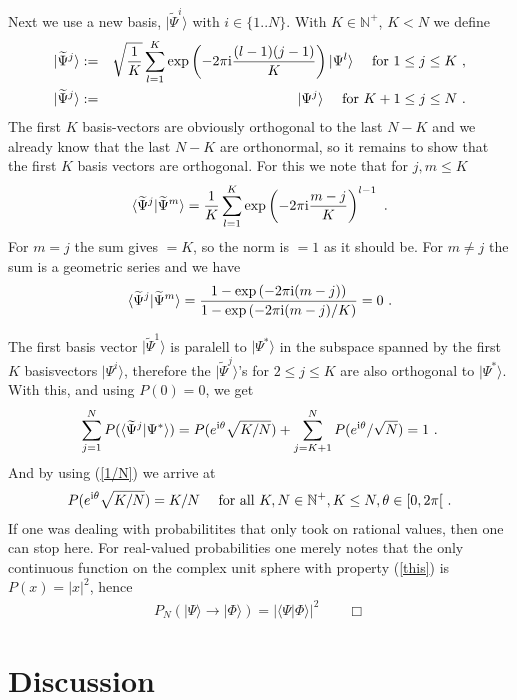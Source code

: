 \documentclass[12pt]{article}
\def\forall{\hbox{\rm for all}}
\def\beqn{\begin{eqnarray}}
\def\eeqn{\end{eqnarray}}
\begin{document}
Next we use a new basis, $|\widetilde \Psi^i \rangle$ with $i \in \{1..N \}$. With $K \in {\mathbb{N}}^+$, $K < N$ we define
\beqn
| \widetilde \Psi^j \rangle &:=& \sqrt{\frac{1}{K}} \sum_{l=1}^K \exp \left( -2 \pi {\rm i} \frac{(l-1) (j-1)}{K} \right) |\Psi^l \rangle  ~~~~{\mbox{for}}~1 \leq j \leq K~, \nonumber\\
| \widetilde \Psi^j \rangle &:=& |\Psi^j \rangle ~~~~{\mbox{for}}~K+1 \leq j \leq N~. \label{tildebasis}
\eeqn
The first $K$ basis-vectors are obviously orthogonal to the last $N-K$ and we already know that the last $N-K$ are orthonormal, so it remains to show that the first $K$ basis vectors are orthogonal. For this we note that for $j,m \leq K$
\beqn
\langle \widetilde \Psi^j | \widetilde \Psi^m \rangle 
= \frac{1}{K} \sum_{l=1}^ K        
\exp \left( -2 \pi {\rm i} \frac{m-j}{K} \right)^{l-1} ~.
\eeqn
For $m=j$ the sum gives $=K$, so the norm is $=1$ as it should be. For $m \neq j$ the sum is a geometric series and we have
\beqn
\langle \widetilde \Psi^j | \widetilde \Psi^m \rangle = \frac{ 1- \exp \left( -2 \pi {\rm i} (m-j)\right)} {1- \exp \left( -2 \pi {\rm i} (m-j) /K \right)  } =0 ~.
\eeqn

The first basis vector $|\widetilde \Psi^1 \rangle$ is paralell to $|\Psi^* \rangle$ in the subspace spanned by the first $K$ basisvectors $|\Psi^i \rangle$, therefore the $|\widetilde \Psi^j \rangle$'s for $2\leq j \leq K$ are also orthogonal to $|\Psi^*\rangle$. With this, and using $P(0) = 0$, we get
\beqn
\sum_{j=1}^N P (\langle \widetilde \Psi^j | \Psi^* \rangle) = P( e^{{\rm i} \theta}  \sqrt{K/N} ) + \sum_{j=K+1}^N P (  e^{{\rm i} \theta}  /\sqrt{N}) = 1~.
\eeqn
And by using (\ref{1/N}) we arrive at
\beqn
P ( e^{{\rm i} \theta} \sqrt{K/N} ) = K/N ~~~~\forall~ K,N \in {\mathbb{N^+}}, K \leq N, \theta \in [0, 2 \pi [~. \label{this}
\eeqn
If one was dealing with probabilitites that only took on rational values, then one can stop here. For real-valued probabilities one merely notes that
the only continuous function on the complex unit sphere with property (\ref{this}) is $P(x) = |x|^2$, hence
\beqn
P_N ( |\Psi \rangle \to |\Phi \rangle) = |\langle \Psi | \Phi \rangle|^2 \qquad \Box
\eeqn


\section{Discussion}
\end{document}
